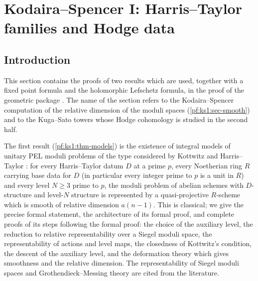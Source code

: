 \section{Kodaira--Spencer I: Harris--Taylor families and Hodge data}\label{sec:pf:ks1}

\providecommand{\ksoneAfp}{\A_f^{p}}
\providecommand{\ksoneH}[3]{H^{#3}(#1,\Omega^{#2})}
\providecommand{\ksoneSp}{\operatorname{Sp}}
\providecommand{\ksonefs}{\textstyle\sum\nolimits^{\mathrm f}}

\subsection{Introduction}\label{pf:ks1:intro}

This section contains the proofs of two results which are used, together with a fixed point
formula and the holomorphic Lefschetz formula, in the proof of the geometric package
. The name of the section refers to
the Kodaira--Spencer computation of the relative dimension of the moduli spaces (\cref{pf:ks1:sec-smooth}) and to
the Kuga--Sato towers whose Hodge cohomology is studied in the second half.

The first result (\cref{pf:ks1:thm-models}) is the existence of integral models of unitary
PEL moduli problems of the type considered by Kottwitz \cite{Kottwitz1992} and Harris--Taylor
\cite{HarrisTaylor2001}: for every Harris--Taylor datum $D$ at a prime $p$, every Noetherian ring $R$
carrying base data for $D$ (in particular every integer prime to $p$ is a unit in $R$) and every
level $N\ge3$ prime to $p$, the moduli problem of abelian schemes with $D$-structure and level-$N$
structure is represented by a quasi-projective $R$-scheme which is smooth of relative dimension
$a(n-1)$. This is classical; we give the precise formal statement, the architecture of its formal
proof, and complete proofs of its steps following the formal proof: the choice of the auxiliary level,
the reduction to relative representability over a Siegel moduli space, the representability of actions and
level maps, the closedness of Kottwitz's condition, the descent of the auxiliary level, and the deformation
theory which gives smoothness and the relative dimension. The representability of Siegel moduli spaces and
Grothendieck--Messing theory are cited from the literature.

